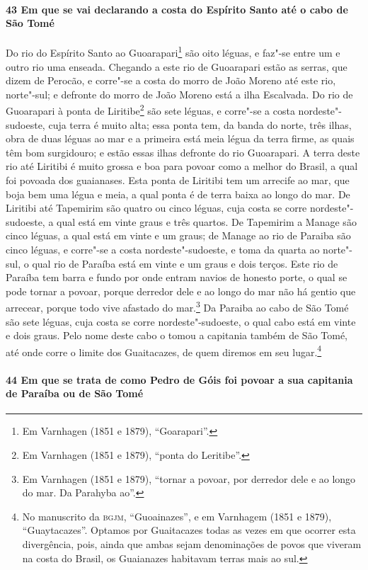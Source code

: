 \paragraph{43 Em que se vai declarando a costa do Espírito Santo até o cabo de São Tomé}

Do rio do Espírito Santo ao Guoarapari\footnote{ Em Varnhagen (1851 e 1879),
``Goarapari''.} são oito léguas, e faz"-se entre um e outro rio uma enseada. Chegando a
este rio de Guoarapari estão as serras, que dizem de Perocão, e corre"-se a costa do morro
de João Moreno até este rio, norte"-sul; e defronte do morro de João Moreno está a ilha
Escalvada. Do rio de Guoarapari à ponta de Liritibe\footnote{ Em Varnhagen (1851 e 1879),
``ponta do Leritibe''.} são sete léguas, e corre"-se a costa nordeste"-sudoeste, cuja terra
é muito alta; essa ponta tem, da banda do norte, três ilhas, obra de duas léguas ao mar e
a primeira está meia légua da terra firme, as quais têm bom surgidouro; e estão essas
ilhas defronte do rio Guoarapari. A terra deste rio até Liritibi é muito grossa e boa para
povoar como a melhor do Brasil, a qual foi povoada dos guaianases. Esta ponta de Liritibi
tem um arrecife ao mar, que boja bem uma légua e meia, a qual ponta é de terra baixa ao
longo do mar. De Liritibi até Tapemirim são quatro ou cinco léguas, cuja costa se corre
nordeste"-sudoeste, a qual está em vinte graus e três quartos. De Tapemirim a Manage são
cinco léguas, a qual está em vinte e um graus; de Manage ao rio de Paraiba são cinco
léguas, e corre"-se a costa nordeste"-sudoeste, e toma da quarta ao norte"-sul, o qual rio de
Paraíba está em vinte e um graus e dois terços. Este rio de Paraíba tem barra e fundo por
onde entram navios de honesto porte, o qual se pode tornar a povoar, porque derredor dele
e ao longo do mar não há gentio que arrecear, porque todo vive afastado do mar.\footnote{
Em Varnhagen (1851 e 1879), ``tornar a povoar, por derredor dele e ao longo do mar. Da
Parahyba ao''.} Da Paraiba ao cabo de São Tomé são sete léguas, cuja costa se corre
nordeste"-sudoeste, o qual cabo está em vinte e dois graus. Pelo nome deste cabo o tomou a
capitania também de São Tomé, até onde corre o limite dos Guaitacazes, de quem diremos em
seu lugar.\footnote{ No manuscrito da \textsc{bgjm}, ``Guoainazes'', e em Varnhagem (1851
e 1879), ``Guaytacazes''. Optamos por Guaitacazes todas as vezes em que ocorrer esta
divergência, pois, ainda que ambas sejam denominações de povos que viveram na costa do
Brasil, os Guaianazes habitavam terras mais ao sul.}

\paragraph{44 Em que se trata de como Pedro de Góis foi povoar a sua capitania de Paraíba
ou de São Tomé}

